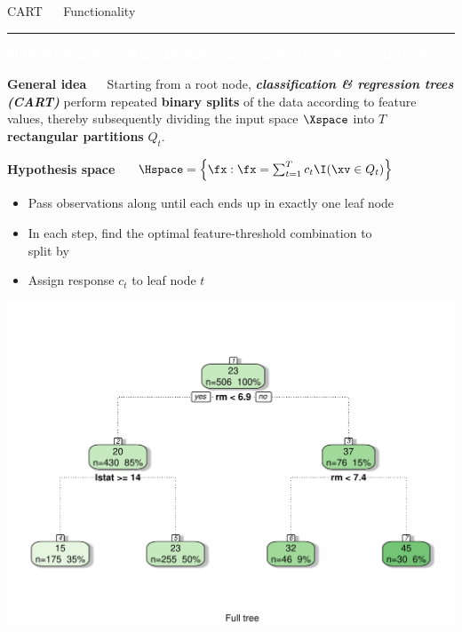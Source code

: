 \documentclass[11pt,compress,t,notes=noshow, xcolor=table]{beamer}
\begin{document}

\LARGE
\begin{frame}{\textcolor{gray!80}{CART} ~~ Functionality}
\normalsize
\vspace{-0.5cm}
\noindent \textcolor{gray!80}{\rule{\textwidth}{1pt}}

\vspace{0.3cm}

\footnotesize

\colorbox{gray!80}{\textcolor{white}{SUPERVISED}} 
\colorbox{gray!80}{\textcolor{white}{NON-PARAMETRIC}} 
\colorbox{gray!80}{\textcolor{white}{WHITE-BOX}} 
\colorbox{gray!80}{\textcolor{white}{FEATURE SELECTION}}

\medskip

\textbf{\textcolor{gray!80}{General idea}} ~~ Starting from a root node, 
\textit{\textbf{classification \& regression trees (CART)}} 
perform repeated \textbf{binary splits} of the data according to feature values, 
thereby subsequently dividing the input space $\Xspace$ into $T$ 
\textbf{rectangular partitions} $Q_t$.

\medskip
 
\textbf{\textcolor{gray!80}{Hypothesis space}} ~~
$\Hspace = \left\{ \fx: \fx = \sum_{t = 1}^T c_t \I(\xv \in Q_t) 
\right\}$

\medskip

\begin{minipage}{0.6\textwidth}
  \begin{itemize}
    \item Pass observations along until each ends up in exactly 
    one leaf node
    \item In each step, find the optimal feature-threshold
    combination to \\ split by
  \item Assign response $c_t$ to leaf node $t$
\end{itemize}

\end{minipage}%
\begin{minipage}{0.4\textwidth}
  \includegraphics[width=\textwidth]{figure/cart.pdf}
\end{minipage}

\end{frame}
\end{document}
